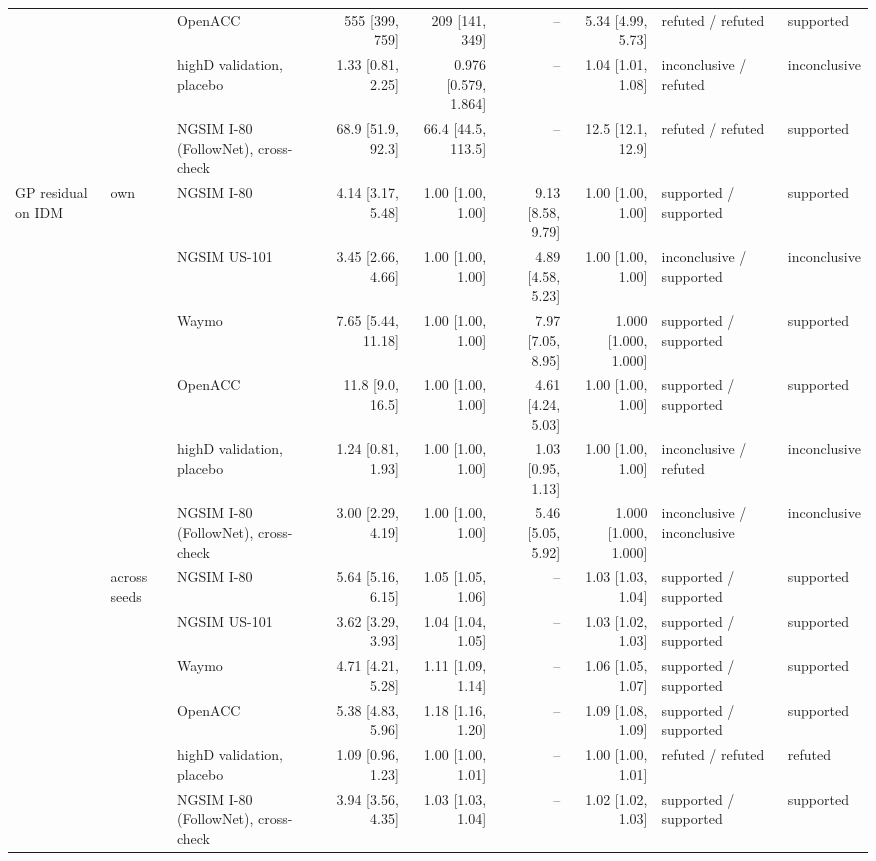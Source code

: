 \begin{longtable}{lllrrrrll}
 &  & OpenACC & 555 [399, 759] & 209 [141, 349] & -- & 5.34 [4.99, 5.73] & refuted / refuted & supported \\
 &  & highD validation, placebo & 1.33 [0.81, 2.25] & 0.976 [0.579, 1.864] & -- & 1.04 [1.01, 1.08] & inconclusive / refuted & inconclusive \\
 &  & NGSIM I-80 (FollowNet), cross-check & 68.9 [51.9, 92.3] & 66.4 [44.5, 113.5] & -- & 12.5 [12.1, 12.9] & refuted / refuted & supported \\
\midrule
GP residual on IDM & own & NGSIM I-80 & 4.14 [3.17, 5.48] & 1.00 [1.00, 1.00] & 9.13 [8.58, 9.79] & 1.00 [1.00, 1.00] & supported / supported & supported \\
 &  & NGSIM US-101 & 3.45 [2.66, 4.66] & 1.00 [1.00, 1.00] & 4.89 [4.58, 5.23] & 1.00 [1.00, 1.00] & inconclusive / supported & inconclusive \\
 &  & Waymo & 7.65 [5.44, 11.18] & 1.00 [1.00, 1.00] & 7.97 [7.05, 8.95] & 1.000 [1.000, 1.000] & supported / supported & supported \\
 &  & OpenACC & 11.8 [9.0, 16.5] & 1.00 [1.00, 1.00] & 4.61 [4.24, 5.03] & 1.00 [1.00, 1.00] & supported / supported & supported \\
 &  & highD validation, placebo & 1.24 [0.81, 1.93] & 1.00 [1.00, 1.00] & 1.03 [0.95, 1.13] & 1.00 [1.00, 1.00] & inconclusive / refuted & inconclusive \\
 &  & NGSIM I-80 (FollowNet), cross-check & 3.00 [2.29, 4.19] & 1.00 [1.00, 1.00] & 5.46 [5.05, 5.92] & 1.000 [1.000, 1.000] & inconclusive / inconclusive & inconclusive \\
\midrule
 & across seeds & NGSIM I-80 & 5.64 [5.16, 6.15] & 1.05 [1.05, 1.06] & -- & 1.03 [1.03, 1.04] & supported / supported & supported \\
 &  & NGSIM US-101 & 3.62 [3.29, 3.93] & 1.04 [1.04, 1.05] & -- & 1.03 [1.02, 1.03] & supported / supported & supported \\
 &  & Waymo & 4.71 [4.21, 5.28] & 1.11 [1.09, 1.14] & -- & 1.06 [1.05, 1.07] & supported / supported & supported \\
 &  & OpenACC & 5.38 [4.83, 5.96] & 1.18 [1.16, 1.20] & -- & 1.09 [1.08, 1.09] & supported / supported & supported \\
 &  & highD validation, placebo & 1.09 [0.96, 1.23] & 1.00 [1.00, 1.01] & -- & 1.00 [1.00, 1.01] & refuted / refuted & refuted \\
 &  & NGSIM I-80 (FollowNet), cross-check & 3.94 [3.56, 4.35] & 1.03 [1.03, 1.04] & -- & 1.02 [1.02, 1.03] & supported / supported & supported \\

\end{longtable}

